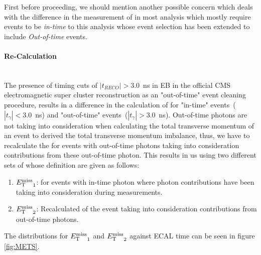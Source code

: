 First before proceeding, we should mention another possible concern which deals with the difference in the measurement of \MET in most analysis which mostly require events to be \textit{in-time} to this
analysis whose event selection has been extended to include \textit{Out-of-time} events.

\paragraph*{\MET Re-Calculation}\mbox{}\\
The presence of timing cuts of $|t_{RECO}| > 3.0$~ns in EB in the official CMS electromagnetic super cluster reconstruction as an "out-of-time" event cleaning procedure, results in a difference in the calculation of \MET for "in-time" events~($|t_{\gamma}| < 3.0$~ns) and "out-of-time" events~($|t_{\gamma}| > 3.0$~ns). Out-of-time photons are not taking into consideration when calculating the total transverse momentum of an event to derived the total transverse momentum imbalance, thus, we have to recalculate the \MET for events with out-of-time photons taking into consideration \pt contributions from these out-of-time photon. This results in us using two different sets of \MET whose   definition are given as follows:
\begin{enumerate}
\item ${E_{\mathrm{T}}^{\text{miss}}}_{1}$: \MET for events with in-time photon where photon \pt contributions have been taking into consideration during \MET measurements.
\item ${E_{\mathrm{T}}^{\text{miss}}}_{2}$: Recalculated \MET of the event taking into consideration \pt contributions from out-of-time photons.
\end{enumerate}
  
The distributions for ${E_{\mathrm{T}}^{\text{miss}}}_{1}$ and ${E_{\mathrm{T}}^{\text{miss}}}_{2}$  against ECAL time can be seen in figure \ref{fig:METS}.

